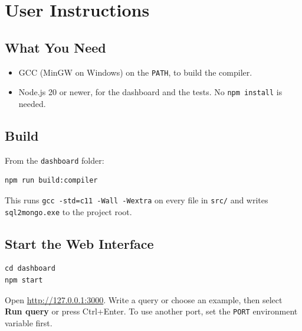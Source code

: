 \documentclass[12pt,a4paper]{report}
\newcommand{\codeus}{\textunderscore\allowbreak}
\DeclareRobustCommand{\code}[1]{\texttt{\let\_\codeus #1}}
\begin{document}
\clearpage
\appendix
\renewcommand{\chaptertitlename}{Appendix}

\chapter{User Instructions}
\section{What You Need}
\begin{itemize}
  \item GCC (MinGW on Windows) on the \code{PATH}, to build the compiler.
  \item Node.js 20 or newer, for the dashboard and the tests. No \code{npm install} is needed.
\end{itemize}

\section{Build}
From the \code{dashboard} folder:
\begin{lstlisting}
npm run build:compiler
\end{lstlisting}
This runs \code{gcc -std=c11 -Wall -Wextra} on every file in \code{src/} and writes \code{sql2mongo.exe} to the project root.

\section{Start the Web Interface}
\begin{lstlisting}
cd dashboard
npm start
\end{lstlisting}
Open \url{http://127.0.0.1:3000}. Write a query or choose an example, then select \textbf{Run query} or press Ctrl+Enter. To use another port, set the \code{PORT} environment variable first.
\end{document}
